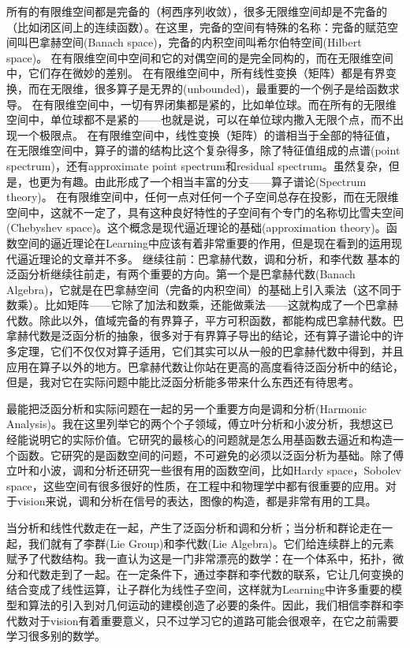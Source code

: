 所有的有限维空间都是完备的（柯西序列收敛），很多无限维空间却是不完备的（比如闭区间上的连续函数）。在这里，完备的空间有特殊的名称：完备的赋范空间叫巴拿赫空间(Banach space)，完备的内积空间叫希尔伯特空间(Hilbert space)。
在有限维空间中空间和它的对偶空间的是完全同构的，而在无限维空间中，它们存在微妙的差别。
在有限维空间中，所有线性变换（矩阵）都是有界变换，而在无限维，很多算子是无界的(unbounded)，最重要的一个例子是给函数求导。
在有限维空间中，一切有界闭集都是紧的，比如单位球。而在所有的无限维空间中，单位球都不是紧的——也就是说，可以在单位球内撒入无限个点，而不出现一个极限点。
在有限维空间中，线性变换（矩阵）的谱相当于全部的特征值，在无限维空间中，算子的谱的结构比这个复杂得多，除了特征值组成的点谱(point spectrum)，还有approximate point spectrum和residual spectrum。虽然复杂，但是，也更为有趣。由此形成了一个相当丰富的分支——算子谱论(Spectrum theory)。
在有限维空间中，任何一点对任何一个子空间总存在投影，而在无限维空间中，这就不一定了，具有这种良好特性的子空间有个专门的名称切比雪夫空间(Chebyshev space)。这个概念是现代逼近理论的基础(approximation theory)。函数空间的逼近理论在Learning中应该有着非常重要的作用，但是现在看到的运用现代逼近理论的文章并不多。
继续往前：巴拿赫代数，调和分析，和李代数
基本的泛函分析继续往前走，有两个重要的方向。第一个是巴拿赫代数(Banach Algebra)，它就是在巴拿赫空间（完备的内积空间）的基础上引入乘法（这不同于数乘）。比如矩阵——它除了加法和数乘，还能做乘法——这就构成了一个巴拿赫代数。除此以外，值域完备的有界算子，平方可积函数，都能构成巴拿赫代数。巴拿赫代数是泛函分析的抽象，很多对于有界算子导出的结论，还有算子谱论中的许多定理，它们不仅仅对算子适用，它们其实可以从一般的巴拿赫代数中得到，并且应用在算子以外的地方。巴拿赫代数让你站在更高的高度看待泛函分析中的结论，但是，我对它在实际问题中能比泛函分析能多带来什么东西还有待思考。

最能把泛函分析和实际问题在一起的另一个重要方向是调和分析(Harmonic Analysis)。我在这里列举它的两个个子领域，傅立叶分析和小波分析，我想这已经能说明它的实际价值。它研究的最核心的问题就是怎么用基函数去逼近和构造一个函数。它研究的是函数空间的问题，不可避免的必须以泛函分析为基础。除了傅立叶和小波，调和分析还研究一些很有用的函数空间，比如Hardy space，Sobolev space，这些空间有很多很好的性质，在工程中和物理学中都有很重要的应用。对于vision来说，调和分析在信号的表达，图像的构造，都是非常有用的工具。

当分析和线性代数走在一起，产生了泛函分析和调和分析；当分析和群论走在一起，我们就有了李群(Lie Group)和李代数(Lie Algebra)。它们给连续群上的元素赋予了代数结构。我一直认为这是一门非常漂亮的数学：在一个体系中，拓扑，微分和代数走到了一起。在一定条件下，通过李群和李代数的联系，它让几何变换的结合变成了线性运算，让子群化为线性子空间，这样就为Learning中许多重要的模型和算法的引入到对几何运动的建模创造了必要的条件。因此，我们相信李群和李代数对于vision有着重要意义，只不过学习它的道路可能会很艰辛，在它之前需要学习很多别的数学。

